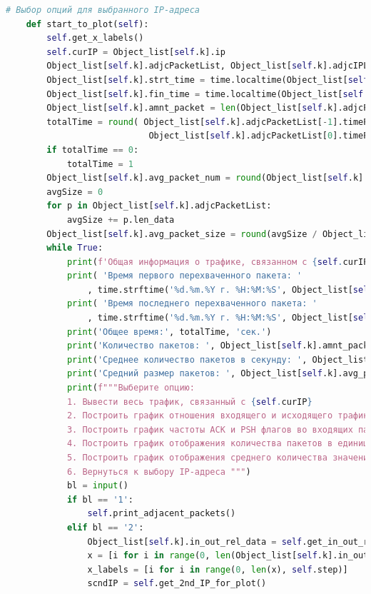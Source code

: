 \documentclass[spec, och, diploma]{SCWorks}
\begin{document}
\begin{lstlisting}[language=Python]
    # Выбор опций для выбранного IP-адреса
    def start_to_plot(self):
        self.get_x_labels()
        self.curIP = Object_list[self.k].ip
        Object_list[self.k].adjcPacketList, Object_list[self.k].adjcIPList = self.get_inf_about_IP()
        Object_list[self.k].strt_time = time.localtime(Object_list[self.k].adjcPacketList[0].timePacket)
        Object_list[self.k].fin_time = time.localtime(Object_list[self.k].adjcPacketList[-1].timePacket)
        Object_list[self.k].amnt_packet = len(Object_list[self.k].adjcPacketList)
        totalTime = round( Object_list[self.k].adjcPacketList[-1].timePacket - \
                            Object_list[self.k].adjcPacketList[0].timePacket )
        if totalTime == 0:
            totalTime = 1
        Object_list[self.k].avg_packet_num = round(Object_list[self.k].amnt_packet / totalTime, 3)
        avgSize = 0
        for p in Object_list[self.k].adjcPacketList:
            avgSize += p.len_data
        Object_list[self.k].avg_packet_size = round(avgSize / Object_list[self.k].amnt_packet, 3)
        while True:
            print(f'Общая информация о трафике, связанном с {self.curIP}')
            print( 'Время первого перехваченного пакета: '
                , time.strftime('%d.%m.%Y г. %H:%M:%S', Object_list[self.k].strt_time) )
            print( 'Время последнего перехваченного пакета: '
                , time.strftime('%d.%m.%Y г. %H:%M:%S', Object_list[self.k].fin_time) )
            print('Общее время:', totalTime, 'сек.')
            print('Количество пакетов: ', Object_list[self.k].amnt_packet)
            print('Среднее количество пакетов в секунду: ', Object_list[self.k].avg_packet_num)
            print('Средний размер пакетов: ', Object_list[self.k].avg_packet_size)  
            print(f"""Выберите опцию:
            1. Вывести весь трафик, связанный с {self.curIP}
            2. Построить график отношения входящего и исходящего трафиков
            3. Построить график частоты ACK и PSH флагов во входящих пакетах
            4. Построить график отображения количества пакетов в единицу времени
            5. Построить график отображения среднего количества значения размеров окна
            6. Вернуться к выбору IP-адреса """)
            bl = input()
            if bl == '1':
                self.print_adjacent_packets()
            elif bl == '2':
                Object_list[self.k].in_out_rel_data = self.get_in_out_rel(self.curIP)
                x = [i for i in range(0, len(Object_list[self.k].in_out_rel_data))]
                x_labels = [i for i in range(0, len(x), self.step)]
                scndIP = self.get_2nd_IP_for_plot()

\end{lstlisting}
\end{document}
